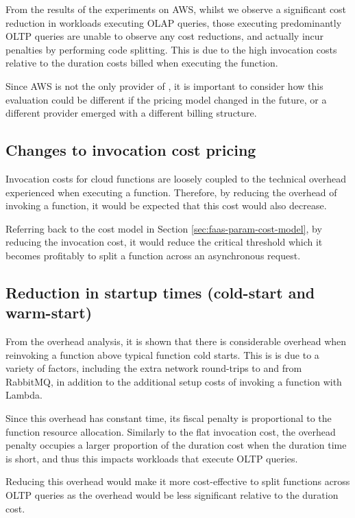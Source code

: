 From the results of the experiments on AWS, whilst we observe a significant cost reduction in workloads executing OLAP queries, those executing predominantly OLTP queries are unable to observe any cost reductions, and actually incur penalties by performing code splitting. This is due to the high invocation costs relative to the duration costs billed when executing the function.

Since AWS is not the only provider of \faas{}, it is important to consider how this evaluation could be different if the pricing model changed in the future, or a different provider emerged with a different billing structure.

\subsection{Changes to invocation cost pricing}
Invocation costs for cloud functions are loosely coupled to the technical overhead experienced when executing a \faas{} function. Therefore, by reducing the overhead of invoking a function, it would be expected that this cost would also decrease.

Referring back to the cost model in Section \ref{sec:faas-param-cost-model}, by reducing the invocation cost, it would reduce the critical threshold which it becomes profitably to split a function across an asynchronous request.

\subsection{Reduction in startup times (cold-start and warm-start)}
From the overhead analysis, it is shown that there is considerable overhead when reinvoking a function above typical function cold starts. This is is due to a variety of factors, including the extra network round-trips to and from RabbitMQ, in addition to the additional setup costs of invoking a function with Lambda.

Since this overhead has constant time, its fiscal penalty is proportional to the function resource allocation. Similarly to the flat invocation cost, the overhead penalty occupies a larger proportion of the duration cost when the duration time is short, and thus this impacts workloads that execute OLTP queries.

Reducing this overhead would make it more cost-effective to split functions across OLTP queries as the overhead would be less significant relative to the duration cost.

